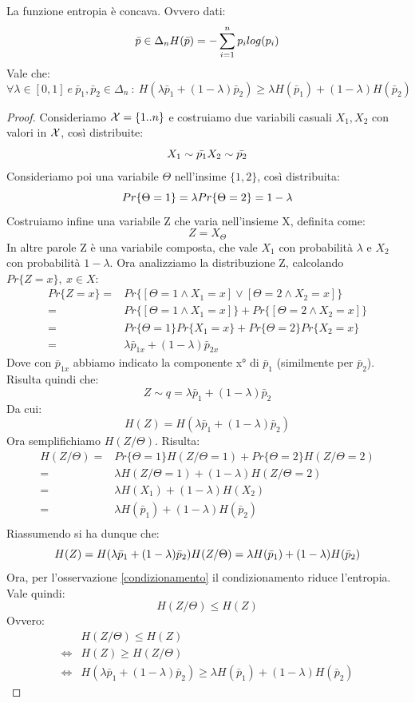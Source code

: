 \begin{osservazione}
 La funzione entropia è concava. Ovvero dati:
 \[
 \bar{p} \in \Delta_n \\
 H(\bar{p})=-\sum_{i=1}^n p_i log(p_i)
 \]
 Vale che:
 \[
  \forall \lambda \in [0,1] \ e \ \bar{p}_1,\bar{p}_2 \in \Delta_n \ : \ 
   H(\lambda \bar{p}_1 + (1-\lambda) \bar{p}_2) \ge \lambda H(\bar{p}_1) + (1-\lambda) H(\bar{p}_2)
 \]

\begin{proof}
 Consideriamo $\mathcal{X}=\{1..n\}$ e costruiamo due variabili casuali $X_1,X_2$ con valori in $\mathcal{X}$, così distribuite:
 \[
  X_1 \sim \bar{p_1} \\ X_2 \sim \bar{p_2}
 \]
 Consideriamo poi una variabile $\Theta$ nell'insime $\{1,2\}$, così distribuita:
 \[
  Pr\{\Theta=1\}=\lambda \\ Pr\{\Theta=2\}=1-\lambda
 \]
 Costruiamo infine una variabile Z che varia nell'insieme X, definita come:
 \[
  Z=X_{\Theta}
 \]
 In altre parole Z è una variabile composta, che vale $X_1$ con probabilità $\lambda$ e $X_2$ con probabilità $1-\lambda$.
 Ora analizziamo la distribuzione Z, calcolando $Pr\{Z=x\} , \ x \in X$:
 \[\begin{split}
  Pr\{Z=x\}=&Pr\{[\Theta=1 \land X_1=x] \lor [\Theta=2 \land X_2=x]  \} \\
  =&Pr\{[\Theta=1 \land X_1=x]\} + Pr\{[\Theta=2 \land X_2=x]  \} \\
  =&Pr\{\Theta=1\} Pr\{X_1=x\} + Pr\{\Theta=2\} Pr\{X_2=x\} \\
  =& \lambda \bar{p}_{1x} + (1-\lambda) \bar{p}_{2x}
  \end{split}
 \]
  Dove con $\bar{p}_{1x}$ abbiamo indicato la componente x° di $\bar{p}_1$ (similmente per $\bar{p}_2$).
  Risulta quindi che:
  \[
   Z \sim q=\lambda \bar{p}_1 + (1-\lambda) \bar{p}_2
  \]
  Da cui:
  \[
   H(Z)=H(\lambda \bar{p}_1 + (1-\lambda) \bar{p}_2)
  \]
  Ora semplifichiamo $H(Z/\Theta)$. Risulta:
  \[\begin{split}
   H(Z/\Theta)=&Pr\{\Theta=1\}H(Z/\Theta=1)+Pr\{\Theta=2\}H(Z/\Theta=2) \\
   =& \lambda H(Z/\Theta=1)+(1-\lambda)H(Z/\Theta=2) \\
   =& \lambda H(X_1)+(1-\lambda)H(X_2) \\
   =& \lambda H(\bar{p}_1)+(1-\lambda)H(\bar{p}_2) \\
   \end{split}
  \]
  Riassumendo si ha dunque che:
  \[
    H(Z)=H(\lambda \bar{p}_1 + (1-\lambda) \bar{p}_2) \\ H(Z/\Theta)=\lambda H(\bar{p}_1)+(1-\lambda)H(\bar{p}_2)
  \]
  Ora, per l'osservazione \ref{condizionamento} il condizionamento riduce l'entropia. Vale quindi:
   \[
     H(Z/\Theta) \le H(Z) 
  \]
  Ovvero:
  \[\begin{split}
   & H(Z/\Theta) \le H(Z) \\
   \iff & H(Z) \ge H(Z/\Theta)  \\
   \iff &  H(\lambda \bar{p}_1 + (1-\lambda) \bar{p}_2) \ge \lambda H(\bar{p}_1)+(1-\lambda)H(\bar{p}_2)
   \end{split}
  \]



\end{proof}
\end{osservazione}
